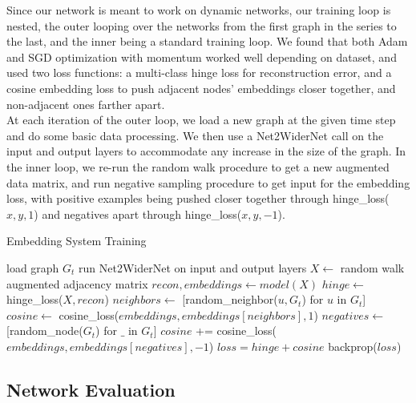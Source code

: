 \documentclass[12pt,twoside]{report}
\begin{document}
Since our network is meant to work on dynamic networks, our training loop is nested, the outer looping over the networks from the first graph in the series to the last, and the inner being a standard training loop. We found that both Adam and SGD optimization with momentum worked well depending on dataset, and used two loss functions: a multi-class hinge loss for reconstruction error, and a cosine embedding loss to push adjacent nodes' embeddings closer together, and non-adjacent ones farther apart. \\

At each iteration of the outer loop, we load a new graph at the given time step and do some basic data processing. We then use a Net2WiderNet \cite{chen2015net2net} call on the input and output layers to accommodate any increase in the size of the graph.  In the inner loop, we re-run the random walk procedure to get a new augmented data matrix, and run negative sampling procedure to get input for the embedding loss, with positive examples being pushed closer together through hinge\_loss($x, y, 1$) and negatives apart through hinge\_loss($x, y, -1$). \\

\begin{algorithm}
\caption{Embedding System Training}
\begin{algorithmic}
\State load graph $G_{t}$
\State run Net2WiderNet on input and output layers
\EndIf
\State $X \gets$ random walk augmented adjacency matrix
\State $recon, embeddings \gets model(X)$
\State $hinge \gets $ hinge\_loss($X, recon$)
\State $neighbors \gets$ [random\_neighbor($u, G_t$) for $u$ in $G_t$]
\State $cosine \gets$ cosine\_loss($embeddings, embeddings[neighbors], 1$)
\State $negatives \gets$ [random\_node($G_t$) for $\_$ in $G_t$]
\State $cosine$ += cosine\_loss($embeddings, embeddings[negatives], -1$)
\EndFor
\State $loss = hinge + cosine$
\State backprop($loss$)
\EndFor
\EndFor
\EndFunction
\end{algorithmic}
\end{algorithm}

\subsection{Network Evaluation}
\end{document}
